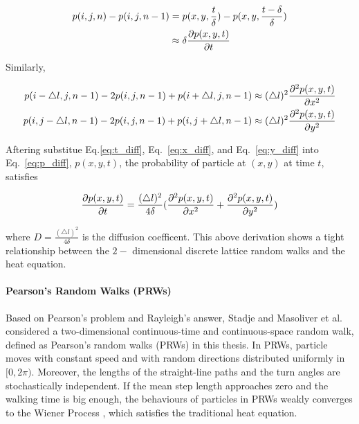 \begin{align}
p(i, j, n) - p(i, j, n-1) &= p(x, y, \frac{t}{\delta}) - p(x, y, \frac{t-\delta}{\delta}) \\
& \approx \delta \frac{\partial p(x,y,t)}{\partial t} \label{eq:t_diff}
\end{align}

Similarly,

\begin{align}
p(i-\triangle l, j, n-1) - 2p(i,j, n-1) + p(i + \triangle l, j, n-1) & \approx (\triangle l)^2 \frac{\partial^2 p(x,y,t)}{\partial x^2}\label{eq:x_diff}\\
p(i, j - \triangle l, n-1) - 2p(i,j, n-1) + p(i, j + \triangle l, n-1) & \approx (\triangle l)^2 \frac{\partial^2 p(x,y,t)}{\partial y^2}\label{eq:y_diff}
\end{align}

Aftering substitue Eq.\ref{eq:t_diff}, Eq.~\ref{eq:x_diff}, and Eq.~\ref{eq:y_diff} into Eq.~\ref{eq:p_diff}, $p(x,y,t)$, the probability of particle at $(x, y)$ at time $t$, satisfies

\begin{equation}\label{eq:lrws_heat}
  \frac{\partial p(x,y,t)}{\partial t} = \frac{(\triangle
    l)^2}{4 \delta} (\frac{\partial ^2 p(x,y,t)}{\partial x^2} +
  \frac{\partial^2 p(x,y,t)}{\partial y^2})
\end{equation}

where $D = \frac{(\triangle l)^2}{4 \delta}$ is the diffusion
coefficent. This above derivation shows a tight relationship between
the $2-$ dimensional discrete lattice random walks and the heat
equation.


\paragraph{Pearson's Random Walks (PRWs)}

Based on Pearson's problem and Rayleigh's answer,
Stadje \cite{stadje1987exact} and Masoliver et
al. \cite{masoliver1993some} considered a two-dimensional
continuous-time and continuous-space random walk, defined as Pearson's
random walks (PRWs) in this thesis. In PRWs, particle moves with
constant speed and with random directions distributed uniformly in
$[0, 2\pi)$. Moreover, the lengths of the straight-line paths and the
turn angles are stochastically independent. If the mean step length
approaches zero and the walking time is big enough, the behaviours of
particles in PRWs weakly converges to the Wiener
Process \cite{stadje1987exact}, which satisfies the traditional heat
equation. 
